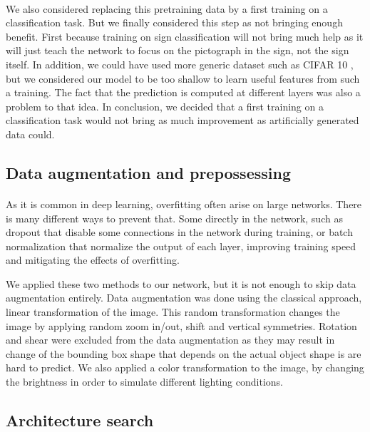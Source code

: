 \paragraph{}
We also considered replacing this pretraining data by a first training on a classification task. But we finally considered this step as not bringing enough benefit. First because training on sign classification will not bring much help as it will just teach the network to focus on the pictograph in the sign, not the sign itself. In addition, we could have used more generic dataset such as CIFAR 10 \cite{krizhevsky2009cifar10}, but we considered our model to be too shallow to learn useful features from such a training. The fact that the prediction is computed at different layers was also a problem to that idea. In conclusion, we decided that a first training on a classification task would not bring as much improvement as artificially generated data could.


\subsection{Data augmentation and prepossessing}
\paragraph{}
As it is common in deep learning, overfitting often arise on large networks. There is many different ways to prevent that. Some directly in the network, such as dropout \cite{srivastava2014dropout} that disable some connections in the network during training, or batch normalization \cite{ioffe2015batch} that normalize the output of each layer, improving training speed and mitigating the effects of overfitting. 

We applied these two methods to our network, but it is not enough to skip data augmentation entirely. Data augmentation was done using the classical approach, linear transformation of the image. This random transformation changes the image by applying random zoom in/out, shift and vertical symmetries. Rotation and shear were excluded from the data augmentation as they may result in change of the bounding box shape that depends on the actual object shape is are hard to predict. We also applied a color transformation to the image, by changing the brightness in order to simulate different lighting conditions.

\subsection{Architecture search}
